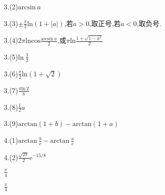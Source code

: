 \documentclass{ctexart}
\begin{document}
3.(2)$\mathrm{arcsin}\ a$

3.(3)$\pm\frac{\pi}{2}\mathrm{ln}(1+|a|)$,若$a>0$,取正号,若$a<0$,取负号.

3.(4)$2\pi \mathrm{ln}\mathrm{cos}\frac{\mathrm{arcsin}\ a}{2}$,或$\pi\mathrm{ln}\frac{1+\sqrt{1-a^{2}}}{2}$

3.(5)$\mathrm{ln}\ \frac{3}{2}$

3.(6)$\frac{\pi}{2}\mathrm{ln}(1+\sqrt{2})$

3.(7)$\frac{\pi\mathrm{ln}\ 2}{8}$

3.(8)$\frac{1}{2}a$

3.(9)$\mathrm{arctan}(1+b)-\mathrm{arctan}(1+a)$

4.(1)$\mathrm{arctan}\ \frac{b}{c}-\mathrm{arctan}\ \frac{a}{c}$

4.(2)$\frac{\sqrt{2\pi}}{2}\mathrm{e}^{-15/8}$

$\frac{\pi}{4}$

$\frac{\pi}{4}$
\end{document}
